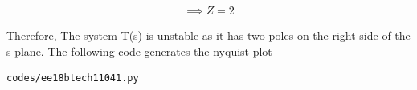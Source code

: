 \begin{enumerate}[label=\thesection.\arabic*.,ref=\thesection.\theenumi]
\begin{align}
    \implies Z = 2
\end{align}

Therefore, The system T(s) is unstable as it has two poles on the right side of the s plane. 
The following code generates the nyquist plot
\begin{lstlisting}
codes/ee18btech11041.py
\end{lstlisting}


\end{enumerate}

